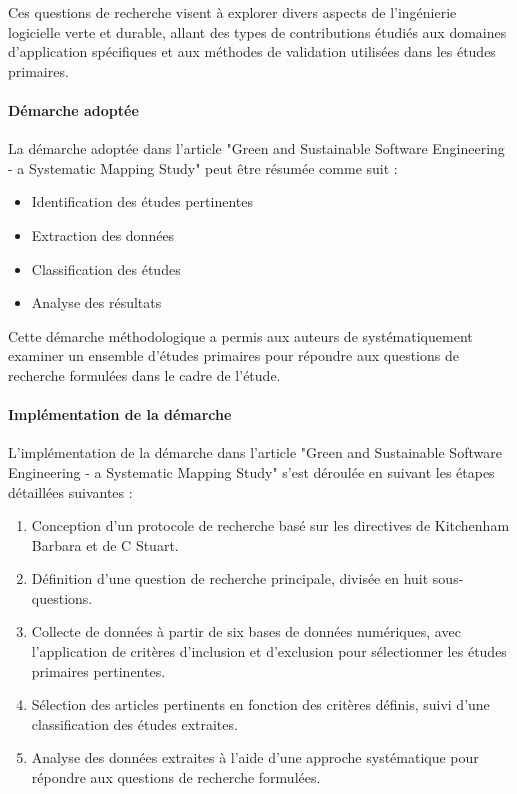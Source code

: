 Ces questions de recherche visent à explorer divers aspects de l'ingénierie logicielle verte et durable, allant des types de contributions étudiés aux domaines d'application spécifiques et aux méthodes de validation utilisées dans les études primaires.

\paragraph{Démarche adoptée}
La démarche adoptée dans l'article "Green and Sustainable Software Engineering - a Systematic Mapping Study" peut être résumée comme suit :
\begin{itemize}
  \item Identification des études pertinentes
  \item Extraction des données
  \item Classification des études
  \item Analyse des résultats
\end{itemize}
Cette démarche méthodologique a permis aux auteurs de systématiquement examiner un ensemble d'études primaires pour répondre aux questions de recherche formulées dans le cadre de l'étude.

\paragraph{Implémentation de la démarche}
L'implémentation de la démarche dans l'article "Green and Sustainable Software Engineering - a Systematic Mapping Study" s'est déroulée en suivant les étapes détaillées suivantes :

\begin{enumerate}
  \item Conception d'un protocole de recherche basé sur les directives de Kitchenham Barbara et de C Stuart.
  \item Définition d'une question de recherche principale, divisée en huit sous-questions.
  \item Collecte de données à partir de six bases de données numériques, avec l'application de critères d'inclusion et d'exclusion pour sélectionner les études primaires pertinentes.
  \item Sélection des articles pertinents en fonction des critères définis, suivi d'une classification des études extraites.
  \item Analyse des données extraites à l'aide d'une approche systématique pour répondre aux questions de recherche formulées.
\end{enumerate}


